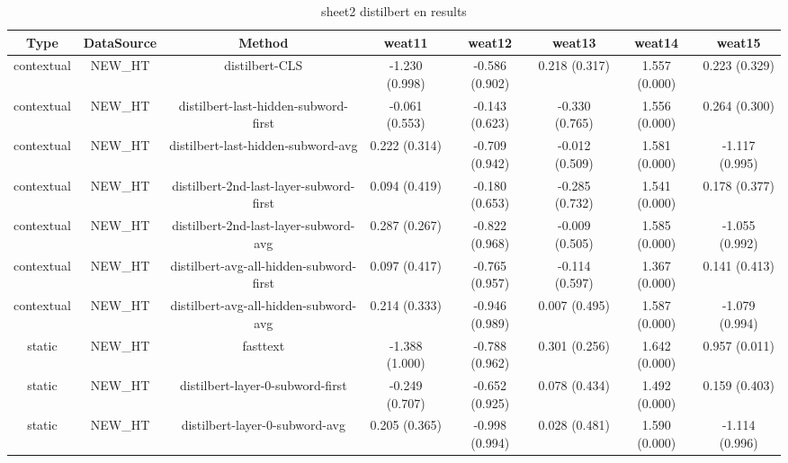 \begin{sidewaystable}[htb]
    \centering
    \caption{sheet2 distilbert en results}
    \label{appendix_tab:sheet2_distilbert_en_results}
    \small
    \begin{tabular}{@{}cccccccc@{}}
        \toprule
        Type & DataSource & Method & weat11 & weat12 & weat13 & weat14 & weat15 \\
        \midrule
        contextual & NEW\_HT & distilbert-CLS & -1.230 (0.998) & -0.586 (0.902) & 0.218 (0.317) & 1.557 (0.000) & 0.223 (0.329) \\
        contextual & NEW\_HT & distilbert-last-hidden-subword-first & -0.061 (0.553) & -0.143 (0.623) & -0.330 (0.765) & 1.556 (0.000) & 0.264 (0.300) \\
        contextual & NEW\_HT & distilbert-last-hidden-subword-avg & 0.222 (0.314) & -0.709 (0.942) & -0.012 (0.509) & 1.581 (0.000) & -1.117 (0.995) \\
        contextual & NEW\_HT & distilbert-2nd-last-layer-subword-first & 0.094 (0.419) & -0.180 (0.653) & -0.285 (0.732) & 1.541 (0.000) & 0.178 (0.377) \\
        contextual & NEW\_HT & distilbert-2nd-last-layer-subword-avg & 0.287 (0.267) & -0.822 (0.968) & -0.009 (0.505) & 1.585 (0.000) & -1.055 (0.992) \\
        contextual & NEW\_HT & distilbert-avg-all-hidden-subword-first & 0.097 (0.417) & -0.765 (0.957) & -0.114 (0.597) & 1.367 (0.000) & 0.141 (0.413) \\
        contextual & NEW\_HT & distilbert-avg-all-hidden-subword-avg & 0.214 (0.333) & -0.946 (0.989) & 0.007 (0.495) & 1.587 (0.000) & -1.079 (0.994) \\
        static & NEW\_HT & fasttext & -1.388 (1.000) & -0.788 (0.962) & 0.301 (0.256) & 1.642 (0.000) & 0.957 (0.011) \\
        static & NEW\_HT & distilbert-layer-0-subword-first & -0.249 (0.707) & -0.652 (0.925) & 0.078 (0.434) & 1.492 (0.000) & 0.159 (0.403) \\
        static & NEW\_HT & distilbert-layer-0-subword-avg & 0.205 (0.365) & -0.998 (0.994) & 0.028 (0.481) & 1.590 (0.000) & -1.114 (0.996) \\
        \bottomrule
    \end{tabular}
\end{sidewaystable}
